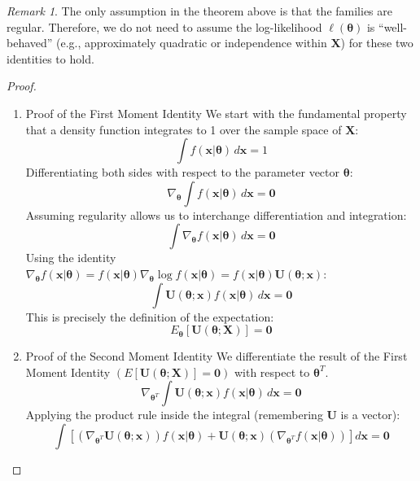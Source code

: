 \documentclass[
  letterpaper,
  DIV=11,
  numbers=noendperiod]{scrreprt}
\renewcommand{\[}{\begin{equation}}
\renewcommand{\]}{\end{equation}}
\theoremstyle{definition}
\theoremstyle{plain}
\theoremstyle{plain}
\theoremstyle{plain}
\theoremstyle{definition}
\theoremstyle{plain}
\theoremstyle{remark}
\newtheorem{refremark}{Remark}[chapter]
\begin{document}
\begin{refremark}
The only assumption in the theorem above is that the families are
regular. Therefore, we do not need to assume the log-likelihood
\(\ell(\boldsymbol{\theta})\) is ``well-behaved'' (e.g., approximately
quadratic or independence within \(\mathbf{X}\)) for these two
identities to hold.

\label{rem-score-moments}

\end{refremark}

\begin{proof}
\leavevmode

\begin{enumerate}
\def\labelenumi{\arabic{enumi}.}
\item
  Proof of the First Moment Identity We start with the fundamental
  property that a density function integrates to 1 over the sample space
  of \(\mathbf{X}\): \[
  \int f(\mathbf{x}|\boldsymbol{\theta}) \, d\mathbf{x} = 1
  \] Differentiating both sides with respect to the parameter vector
  \(\boldsymbol{\theta}\): \[
  \nabla_{\boldsymbol{\theta}} \int f(\mathbf{x}|\boldsymbol{\theta}) \, d\mathbf{x} = \mathbf{0}
  \] Assuming regularity allows us to interchange differentiation and
  integration: \[
  \int \nabla_{\boldsymbol{\theta}} f(\mathbf{x}|\boldsymbol{\theta}) \, d\mathbf{x} = \mathbf{0}
  \] Using the identity
  \(\nabla_{\boldsymbol{\theta}} f(\mathbf{x}|\boldsymbol{\theta}) = f(\mathbf{x}|\boldsymbol{\theta}) \nabla_{\boldsymbol{\theta}} \log f(\mathbf{x}|\boldsymbol{\theta}) = f(\mathbf{x}|\boldsymbol{\theta}) \mathbf{U}(\boldsymbol{\theta}; \mathbf{x})\):
  \[
  \int \mathbf{U}(\boldsymbol{\theta}; \mathbf{x}) f(\mathbf{x}|\boldsymbol{\theta}) \, d\mathbf{x} = \mathbf{0}
  \] This is precisely the definition of the expectation: \[
  E_{\boldsymbol{\theta}} [ \mathbf{U}(\boldsymbol{\theta}; \mathbf{X}) ] = \mathbf{0}
  \]
\item
  Proof of the Second Moment Identity We differentiate the result of the
  First Moment Identity
  \((E[\mathbf{U}(\boldsymbol{\theta}; \mathbf{X})]=\mathbf{0})\) with
  respect to \(\boldsymbol{\theta}^T\). \[
  \nabla_{\boldsymbol{\theta}^T} \int \mathbf{U}(\boldsymbol{\theta}; \mathbf{x}) f(\mathbf{x}|\boldsymbol{\theta}) \, d\mathbf{x} = \mathbf{0}
  \] Applying the product rule inside the integral (remembering
  \(\mathbf{U}\) is a vector): \[
  \int \left[ \left( \nabla_{\boldsymbol{\theta}^T} \mathbf{U}(\boldsymbol{\theta}; \mathbf{x}) \right) f(\mathbf{x}|\boldsymbol{\theta}) + \mathbf{U}(\boldsymbol{\theta}; \mathbf{x}) \left( \nabla_{\boldsymbol{\theta}^T} f(\mathbf{x}|\boldsymbol{\theta}) \right) \right] d\mathbf{x} = \mathbf{0}
  \]


\end{enumerate}
\end{proof}
\end{document}
